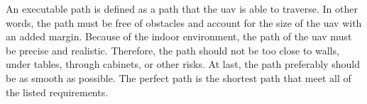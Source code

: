 An executable path is defined as a path that the \acs{uav} is able to traverse. In other words, the path must be free of obstacles and account for the size of the \acs{uav} with an added margin. Because of the indoor environment, the path of the \acs{uav} must be precise and realistic. Therefore, the path should not be too close to walls, under tables, through cabinets, or other risks. At last, the path preferably should be as smooth as possible. The perfect path is the shortest path that meet all of the listed requirements.